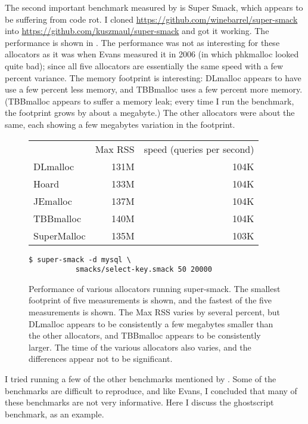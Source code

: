 \documentclass[natbib,sort&compress]{sigplanconf}
\begin{document}
The second important benchmark measured by \cite{Evans06} is Super
Smack, which appears to be suffering from code rot.  I cloned
\url{https://github.com/winebarrel/super-smack} into
\url{https://github.com/kuszmaul/super-smack} and got it working.  The
performance is shown in .  The performance was not
as interesting for these allocators as it was when Evans measured it
in 2006 (in which phkmalloc looked quite bad); since all five
allocators are essentially the same speed with a few percent variance.
The memory footprint is interesting: DLmalloc appears to have use a
few percent less memory, and TBBmalloc uses a few percent more
memory. (TBBmalloc appears to suffer a memory leak; every time I run
the benchmark, the footprint grows by about a megabyte.)  The other
allocators were about the same, each showing a few megabytes variation
in the footprint.

\begin{figure}
\begin{center}
\begin{tabular}{lrr}
 & Max RSS & speed (queries per second)\\
 DLmalloc     &131M  &  104K \\
 Hoard        &133M  &  104K \\
 JEmalloc     &137M  &  104K \\
 TBBmalloc    &140M  &  104K \\
 SuperMalloc  &135M  &  103K
\end{tabular}
\end{center}
\begin{verbatim}
$ super-smack -d mysql \
           smacks/select-key.smack 50 20000
\end{verbatim}
\caption{Performance of various allocators running super-smack.  The
  smallest footprint of five measurements is shown, and the fastest of
  the five measurements is shown.  The Max RSS varies by several
  percent, but DLmalloc appears to be consistently a few megabytes
  smaller than the other allocators, and TBBmalloc appears to be
  consistently larger.  The time of the various allocators also
  varies, and the differences appear not to be significant.}
\label{fig:supersmack}
\end{figure}

I tried running a few of the other benchmarks mentioned by
\cite{Evans06}.  Some of the benchmarks are difficult to reproduce,
and like Evans, I concluded that many of these benchmarks are not very
informative.  Here I discuss the ghostscript benchmark, as an example.
\end{document}
